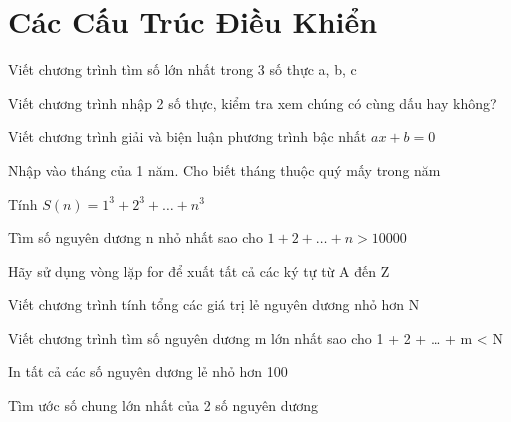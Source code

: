 
\chapter{Các Cấu Trúc Điều Khiển}
\hypertarget{localtoc\thechapter}{}
\localtoc

\begin{problem}
    Viết chương trình tìm số lớn nhất trong 3 số thực a, b, c
\end{problem}

\begin{problem}
    Viết chương trình nhập 2 số thực, kiểm tra xem chúng có cùng dấu hay không?
\end{problem}

\begin{problem}
    Viết chương trình giải và biện luận phương trình bậc nhất $ax + b = 0$
\end{problem}

\begin{problem}
    Nhập vào tháng của 1 năm. Cho biết tháng thuộc quý mấy trong năm
\end{problem}

\begin{problem}
    Tính $S(n) = 1^3 + 2^3 + … + n^3$
\end{problem}

\begin{problem}
    Tìm số nguyên dương n nhỏ nhất sao cho $1 + 2 + … + n > 10000$
\end{problem}

\begin{problem}
    Hãy sử dụng vòng lặp for để xuất tất cả các ký tự từ A đến Z
\end{problem}

\begin{problem}
    Viết chương trình tính tổng các giá trị lẻ nguyên dương nhỏ hơn N
\end{problem}

\begin{problem}
    Viết chương trình tìm số nguyên dương m lớn nhất sao cho 1 + 2 + … + m < N
\end{problem}

\begin{problem}
    In tất cả các số nguyên dương lẻ nhỏ hơn 100
\end{problem}

\begin{problem}
    Tìm ước số chung lớn nhất của 2 số nguyên dương
\end{problem}

